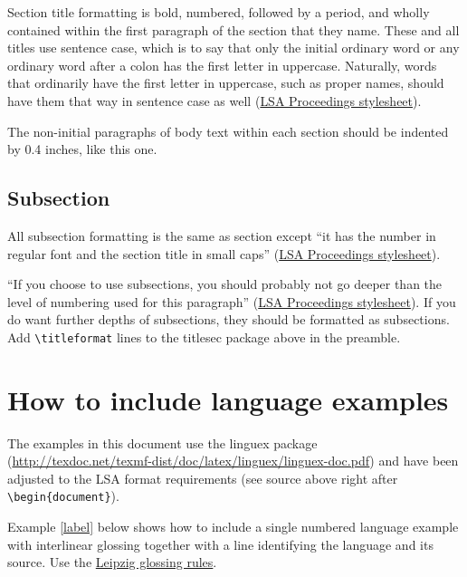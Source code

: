 \documentclass[12pt,letterpaper]{article}
\begin{document}
Section title formatting is bold, numbered, followed by a period, and wholly contained within the first paragraph of the section that they name. These and all titles use sentence case, which is to say that only the initial ordinary word or any ordinary word after a colon has the first letter in uppercase. Naturally, words that ordinarily have the first letter in uppercase, such as proper names, should have them that way in sentence case as well (\href{http://journals.linguisticsociety.org/proceedings/index.php/PLSA/pages/view/instructions}{LSA Proceedings stylesheet}).

The non-initial paragraphs of body text within each section should be indented by 0.4 inches, like this one.
 
 
 
 \subsection{Subsection} 
All subsection formatting is the same as section except ``it has the number in regular font and the section title in small caps'' (\href{http://journals.linguisticsociety.org/proceedings/index.php/PLSA/pages/view/instructions}{LSA Proceedings stylesheet}).

``If you choose to use subsections, you should probably not go deeper than the level of numbering used for this paragraph'' (\href{http://journals.linguisticsociety.org/proceedings/index.php/PLSA/pages/view/instructions}{LSA Proceedings stylesheet}). If you do want further depths of subsections, they should be formatted as subsections. Add \verb=\titleformat= lines to the titlesec package above in the preamble. 



\section{How to include language examples}

The examples in this document use the linguex package 	(\href{http://texdoc.net/texmf-dist/doc/latex/linguex/linguex-doc.pdf}{http://texdoc.net/texmf-dist/doc/latex/linguex/linguex-doc.pdf}) and have been adjusted to the LSA format requirements (see source above right after \verb=\begin{document}=). 

Example \ref{label} below shows how to include a single numbered language example with interlinear glossing together with a line identifying the language and its source. Use the \href{http://www.eva.mpg.de/lingua/resources/glossing-rules.php}{Leipzig glossing rules}.
\end{document}
